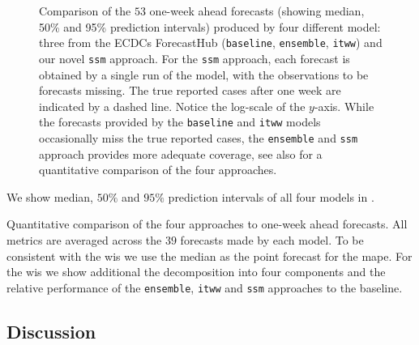 

\begin{figure}
    \resizebox{\textwidth}{!}{%
    }
    \caption{Comparison of the $53$ one-week ahead forecasts (showing median, 50\% and 95\% prediction intervals) produced by four different model: three from the ECDCs ForecastHub (\texttt{baseline}, \texttt{ensemble}, \texttt{itww}) and our novel \texttt{ssm} approach. For the \texttt{ssm} approach, each forecast is obtained by a single run of the model, with the observations to be forecasts missing. The true reported cases after one week are indicated by a dashed line. Notice the log-scale of the $y$-axis. While the forecasts provided by the \texttt{baseline} and \texttt{itww} models occasionally miss the true reported cases, the \texttt{ensemble} and \texttt{ssm} approach provides more adequate coverage, see also  for a quantitative comparison of the four approaches.}

    \label{fig:regional_forecasts_comparison.tex}
\end{figure}

We show median, $50\%$ and $95\%$ prediction intervals of all four models in . 


\begin{table}
    \centering
    
    \caption{Quantitative comparison of the four approaches to one-week ahead forecasts. All metrics are averaged across the $39$ forecasts made by each model. To be consistent with the \gls{wis} we use the median as the point forecast for the \gls{mape}. For the \gls{wis} we show additional the decomposition into four components and the relative performance of the \texttt{ensemble}, \texttt{itww} and 
    \texttt{ssm} approaches to the baseline. }
    \label{tab:regional_forecasts_combined_metrics}
\end{table}





\subsection{Discussion}

